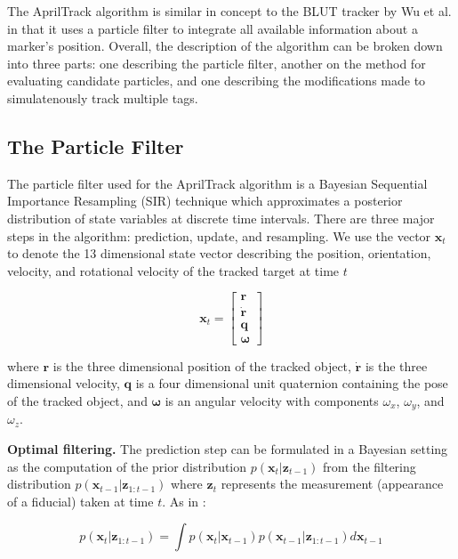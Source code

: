 \documentclass[letterpaper, 10 pt, conference]{ieeeconf}
\renewcommand{\vec}[1]{\boldsymbol{#1}}
\begin{document}
The AprilTrack algorithm is similar in concept to the BLUT tracker by Wu et al. \cite{BLUT} in that it uses a particle filter to integrate all available information about a marker's position. Overall, the description of the algorithm can be broken down into three parts: one describing the particle filter, another on the method for evaluating candidate particles, and one describing the modifications made to simulatenously track multiple tags.

\subsection{The Particle Filter}

The particle filter used for the AprilTrack algorithm is a Bayesian Sequential Importance Resampling (SIR) technique which approximates a posterior distribution of state variables at discrete time intervals. There are three major steps in the algorithm: prediction, update, and resampling. We use the vector  $\vec{x}_t$  to denote the 13 dimensional state vector describing the position, orientation, velocity, and rotational velocity of the tracked target at time $t$ 

\begin{equation}
\vec{x}_t = 
\begin{bmatrix}
	\vec{r} \\
	\dot{\vec{r}} \\
	\vec{q} \\
	\vec{\omega}
\end{bmatrix}
\end{equation}

where $\vec{r}$ is the three dimensional position of the tracked object, $\dot{\vec{r}}$ is the three dimensional velocity, $\vec{q}$ is a four dimensional unit quaternion containing the pose of the tracked object, and $\vec{\omega}$ is an angular velocity with components $\omega_x$, $\omega_y$, and $\omega_z$.




\textbf{Optimal filtering.} The prediction step can be formulated in a Bayesian setting as the computation of the prior distribution $p(\vec{x}_{t}|\vec{z}_{t-1})$ from the filtering distribution $p(\vec{x}_{t-1}|\vec{z}_{1:t-1})$ where $\vec{z}_t$ represents the measurement (appearance of a fiducial) taken at time $t$. As in \cite{ParticleNotes}:

\begin{equation} \label{eq:predict}
p(\vec{x}_t|\vec{z}_{1:t-1}) = \int p(\vec{x}_t | \vec{x}_{t-1})p(\vec{x}_{t-1}|\vec{z}_{1:t-1})d\vec{x}_{t-1}
\end{equation}
\end{document}
